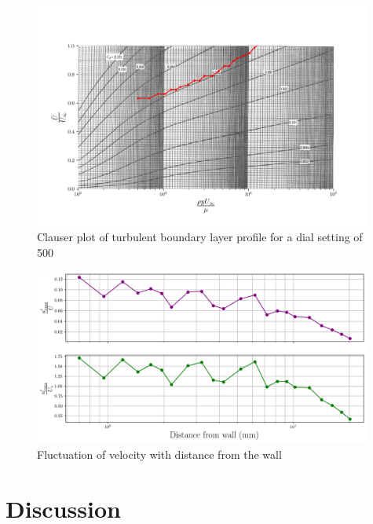 \documentclass{article}
\begin{document}
\begin{figure}[H]
    \centering
    \includegraphics[width=0.99\textwidth]{clauser_data.png}
    \caption{Clauser plot of turbulent boundary layer profile for a dial setting of 500 \cite{handout}}
    \label{fig:clauser}
\end{figure}

\begin{figure}[H]
    \centering
    \includegraphics[width=0.99\textwidth]{u_fluctuation.png}
    \caption{Fluctuation of velocity with distance from the wall}
    \label{fig:fluctuation}
\end{figure}


\section{Discussion}
\end{document}

